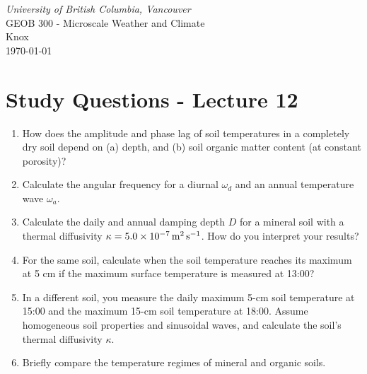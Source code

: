 \documentclass[11pt]{article}
\author{Andy Black and Andreas Christen}
\begin{document}
\begin{center}
\emph{University of British Columbia, Vancouver}\\
GEOB 300 - Microscale Weather and Climate\\
Knox\\
\today
\section*{Study Questions - Lecture 12}
\end{center}

\begin{enumerate}

\item How does the amplitude and phase lag of soil temperatures in a completely dry soil depend on (a) depth, and (b) soil organic matter
content (at constant porosity)?

\item Calculate the angular frequency for a diurnal $\omega_d$ and an annual temperature wave $\omega_a$.

\item Calculate the daily and annual damping depth $D$ for a mineral soil with a thermal diffusivity $\kappa = 5.0 \times 10^{-7}\,\rm{m}^2\,\rm{s}^{-1}$. How do you interpret your results?

\item For the same soil, calculate when the soil temperature reaches its maximum at 5 cm if the maximum surface temperature is measured at 13:00?

\item In a different soil, you measure the daily maximum 5-cm soil temperature at 15:00 and the maximum 15-cm soil temperature at 18:00. Assume homogeneous soil properties and sinusoidal waves, and calculate the soil's thermal diffusivity $\kappa$.

\item Briefly compare the temperature regimes of mineral and organic soils.

\end{enumerate}
\end{document}
